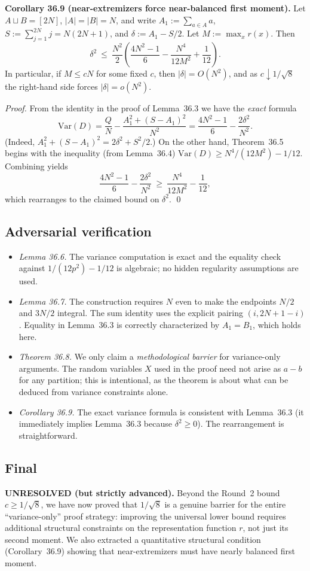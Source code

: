 \medskip
\noindent\textbf{Corollary 36.9 (near-extremizers force near-balanced first moment).}
Let \(A\sqcup B=[2N]\), \(|A|=|B|=N\), and write
\(A_1:=\sum_{a\in A} a\), \(S:=\sum_{j=1}^{2N} j=N(2N+1)\), and
\(\delta:=A_1-S/2\).
Let \(M:=\max_x r(x)\).
Then
\[
\delta^2\ \le\ \frac{N^2}{2}\left(\frac{4N^2-1}{6}-\frac{N^4}{12M^2}+\frac{1}{12}\right).
\]
In particular, if \(M\le cN\) for some fixed \(c\), then \(|\delta|=O(N^2)\), and as \(c\downarrow 1/\sqrt 8\) the right-hand side forces \(|\delta|=o(N^2)\).

\noindent\emph{Proof.}
From the identity in the proof of Lemma~36.3 we have the \emph{exact} formula
\[
\mathrm{Var}(D)=\frac{Q}{N}-\frac{A_1^2+(S-A_1)^2}{N^2}
=\frac{4N^2-1}{6}-\frac{2\delta^2}{N^2}.
\]
(Indeed, \(A_1^2+(S-A_1)^2=2\delta^2+S^2/2\).)
On the other hand, Theorem~36.5 begins with the inequality (from Lemma~36.4)
\(
\mathrm{Var}(D)\ge N^4/(12M^2)-1/12.
\)
Combining yields
\[
\frac{4N^2-1}{6}-\frac{2\delta^2}{N^2}\ \ge\ \frac{N^4}{12M^2}-\frac{1}{12},
\]
which rearranges to the claimed bound on \(\delta^2\).
\qed

\subsection{Adversarial verification}
\begin{itemize}
\item \emph{Lemma 36.6.} The variance computation is exact and the equality check against \(1/(12p^2)-1/12\) is algebraic; no hidden regularity assumptions are used.
\item \emph{Lemma 36.7.} The construction requires \(N\) even to make the endpoints \(N/2\) and \(3N/2\) integral. The sum identity uses the explicit pairing \((i,2N+1-i)\). Equality in Lemma~36.3 is correctly characterized by \(A_1=B_1\), which holds here.
\item \emph{Theorem 36.8.} We only claim a \emph{methodological barrier} for variance-only arguments. The random variables \(X\) used in the proof need not arise as \(a-b\) for any partition; this is intentional, as the theorem is about what can be deduced from variance constraints alone.
\item \emph{Corollary 36.9.} The exact variance formula is consistent with Lemma~36.3 (it immediately implies Lemma~36.3 because \(\delta^2\ge 0\)). The rearrangement is straightforward.
\end{itemize}

\subsection{Final}
\textbf{UNRESOLVED (but strictly advanced).}
Beyond the Round~2 bound \(c\ge 1/\sqrt 8\), we have now proved that \(1/\sqrt 8\) is a genuine barrier for the entire ``variance-only'' proof strategy: improving the universal lower bound requires additional structural constraints on the representation function \(r\), not just its second moment.
We also extracted a quantitative structural condition (Corollary~36.9) showing that near-extremizers must have nearly balanced first moment.

